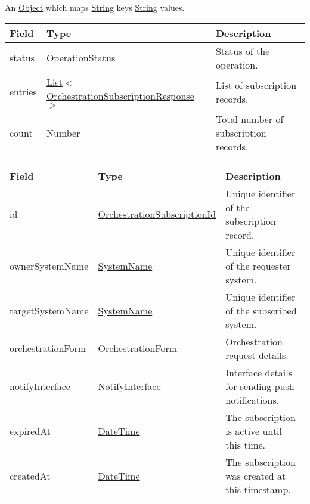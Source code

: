 \documentclass[a4paper]{arrowhead}
\newcommand{\pdef}[1]{{\textcolor{ArrowheadGrey}{#1\label{sec:model:primitives:#1}\label{sec:model:primitives:#1s}\label{sec:model:primitives:#1es}}}}
\newcommand{\pref}[1]{{\textcolor{ArrowheadGrey}{\hyperref[sec:model:primitives:#1]{#1}}}}
\begin{document}

An \pref{Object} which maps \pref{String} keys \pref{String} values.

 
\begin{table}[ht!]
\begin{tabularx}{\textwidth}{| p{3cm} | p{6.8cm} | X |} \hline
\rowcolor{gray!33} Field & Type & Description \\ \hline
status & \pdef{OperationStatus} & Status of the operation. \\ \hline
entries & \pref{List}$<$\hyperref[sec:model:OrchestrationSubscriptionResponse]{OrchestrationSubscriptionResponse}$>$ & List of subscription records. \\ \hline
count & \pdef{Number} & Total number of subscription records. \\ \hline
\end{tabularx}
\end{table}

\clearpage


\begin{table}[ht!]
\begin{tabularx}{\textwidth}{| p{3cm} | p{5.1cm} | X |} \hline
\rowcolor{gray!33} Field & Type & Description \\ \hline
id & \pref{OrchestrationSubscriptionId} & Unique identifier of the subscription record. \\ \hline
ownerSystemName & \pref{SystemName} & Unique identifier of the requester system. \\ \hline
targetSystemName & \pref{SystemName} & Unique identifier of the subscribed system. \\ \hline
orchestrationForm & \hyperref[sec:model:OrchestrationForm]{OrchestrationForm} & Orchestration request details. \\ \hline
notifyInterface & \hyperref[sec:model:NotifyInterface]{NotifyInterface} & Interface details for sending push notifications. \\ \hline
expiredAt & \pref{DateTime} & The subscription is active until this time. \\ \hline
createdAt & \pref{DateTime} & The subscription was created at this timestamp. \\ \hline
\end{tabularx}
\end{table}
\end{document}
